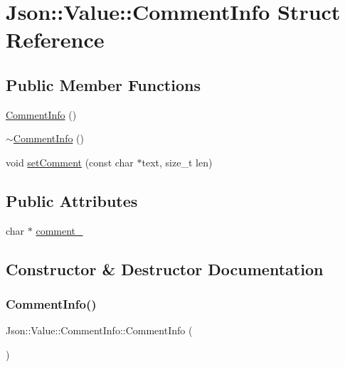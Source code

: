 \hypertarget{structJson_1_1Value_1_1CommentInfo}{}\section{Json\+:\+:Value\+:\+:Comment\+Info Struct Reference}
\label{structJson_1_1Value_1_1CommentInfo}
\subsection*{Public Member Functions}
\begin{DoxyCompactItemize}
\item 
\hyperlink{structJson_1_1Value_1_1CommentInfo_ab23b0c125695d284bded2fb106a49043_ab23b0c125695d284bded2fb106a49043}{Comment\+Info} ()
\item 
\hyperlink{structJson_1_1Value_1_1CommentInfo_ab4d0877190bdbf484e4e2a3bade42ac8_ab4d0877190bdbf484e4e2a3bade42ac8}{$\sim$\+Comment\+Info} ()
\item 
void \hyperlink{structJson_1_1Value_1_1CommentInfo_a4d01c2cd8c07995969c5d636dfd4fa8c_a4d01c2cd8c07995969c5d636dfd4fa8c}{set\+Comment} (const char $\ast$text, size\+\_\+t len)
\end{DoxyCompactItemize}
\subsection*{Public Attributes}
\begin{DoxyCompactItemize}
\item 
char $\ast$ \hyperlink{structJson_1_1Value_1_1CommentInfo_a020f19c7098bab8ec8fec14cd1a5afb9_a020f19c7098bab8ec8fec14cd1a5afb9}{comment\+\_\+}
\end{DoxyCompactItemize}


\subsection{Constructor \& Destructor Documentation}
\mbox{\label{structJson_1_1Value_1_1CommentInfo_ab23b0c125695d284bded2fb106a49043_ab23b0c125695d284bded2fb106a49043}} 
\subsubsection{\texorpdfstring{Comment\+Info()}{CommentInfo()}}
{\footnotesize\ttfamily Json\+::\+Value\+::\+Comment\+Info\+::\+Comment\+Info (\begin{DoxyParamCaption}{ }\end{DoxyParamCaption})}


